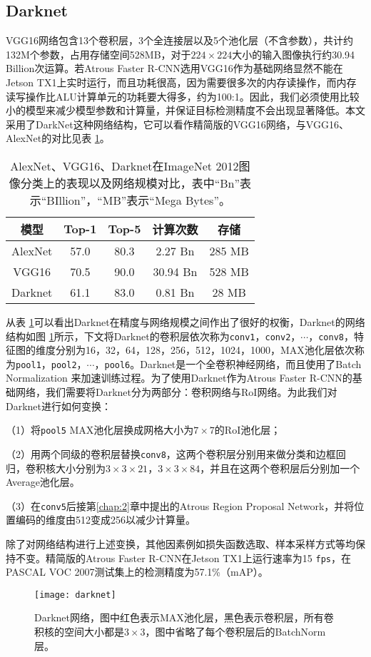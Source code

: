 \subsection{Darknet}
VGG16网络包含13个卷积层，3个全连接层以及5个池化层（不含参数），共计约132M个参数，占用存储空间528MB，对于$224\times224$大小的输入图像执行约30.94 Billion次运算。若Atrous Faster R-CNN选用VGG16作为基础网络显然不能在Jetson TX1上实时运行，而且功耗很高，因为需要很多次的内存读操作，而内存读写操作比ALU计算单元的功耗要大得多，约为100:1。因此，我们必须使用比较小的模型来减少模型参数和计算量，并保证目标检测精度不会出现显著降低。本文采用了DarkNet这种网络结构，它可以看作精简版的VGG16网络，与VGG16、AlexNet的对比见表 \ref{tab:nets}。
\begin{table}
	\caption{AlexNet、VGG16、Darknet在ImageNet 2012图像分类上的表现以及网络规模对比，表中``Bn''表示``BIllion''，``MB''表示``Mega Bytes''。}
	\centering
	\begin{tabular}{ccccc}
		\toprule
		模型 & Top-1 & Top-5 & 计算次数 & 存储\\
		\midrule
		AlexNet & 57.0 & 80.3 & 2.27 Bn & 285 MB\\
		VGG16 & 70.5 & 90.0 & 30.94 Bn & 528 MB\\
		Darknet & 61.1 & 83.0 & 0.81 Bn & 28 MB\\
		\bottomrule		
	\end{tabular}	
	\label{tab:nets}
\end{table}

从表 \ref{tab:nets}可以看出Darknet在精度与网络规模之间作出了很好的权衡，Darknet的网络结构如图 \ref{fig:darknet}所示，下文将Darknet的卷积层依次称为\texttt{conv1}，\texttt{conv2}，$\cdots$，\texttt{conv8}，特征图的维度分别为16，32，64，128，256，512，1024，1000，MAX池化层依次称为\texttt{pool1}，\texttt{pool2}，$\cdots$，\texttt{pool6}。Darknet是一个全卷积神经网络，而且使用了Batch Normalization \cite{batch-norm}来加速训练过程。为了使用Darknet作为Atrous Faster R-CNN的基础网络，我们需要将Darknet分为两部分：卷积网络与RoI网络。为此我们对Darknet进行如何变换：
\begin{namelist}{}
	\item
	（1）将\texttt{pool5} MAX池化层换成网格大小为$7\times7$的RoI池化层；
	\item
	（2）用两个同级的卷积层替换\texttt{conv8}，这两个卷积层分别用来做分类和边框回归，卷积核大小分别为$3\times3\times21$，$3\times3\times84$，并且在这两个卷积层后分别加一个Average池化层。
	\item
	（3）在\texttt{conv5}后接第\ref{chap:2}章中提出的Atrous Region Proposal Network，并将位置编码的维度由512变成256以减少计算量。
\end{namelist}
除了对网络结构进行上述变换，其他因素例如损失函数选取、样本采样方式等均保持不变。精简版的Atrous Faster R-CNN在Jetson TX1上运行速率为15 \texttt{fps}，在PASCAL VOC 2007测试集上的检测精度为57.1\%（mAP）。
\begin{figure}[h]
	\centering
	\texttt{[image: darknet]}
	\caption{Darknet网络，图中红色表示MAX池化层，黑色表示卷积层，所有卷积核的空间大小都是$3\times3$，图中省略了每个卷积层后的BatchNorm层。}
	\label{fig:darknet}
\end{figure}

